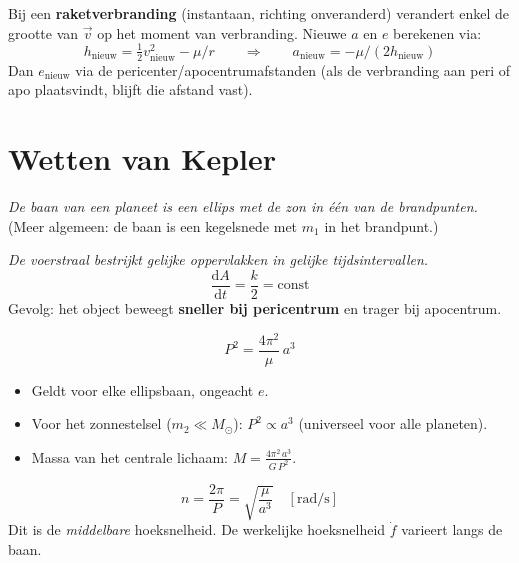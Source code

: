 \documentclass[11pt, a4paper]{article}
\newcommand{\dd}{\mathrm{d}}
\begin{document}
\begin{tip}
Bij een \textbf{raketverbranding} (instantaan, richting onveranderd) verandert enkel de grootte van $\vec{v}$ op het moment van verbranding. Nieuwe $a$ en $e$ berekenen via:
\[
  h_\mathrm{nieuw} = \tfrac{1}{2}v_\mathrm{nieuw}^2 - \mu/r
  \qquad \Rightarrow \qquad a_\mathrm{nieuw} = -\mu/(2h_\mathrm{nieuw})
\]
Dan $e_\mathrm{nieuw}$ via de pericenter/apocentrumafstanden (als de verbranding aan peri of apo plaatsvindt, blijft die afstand vast).
\end{tip}

\section{Wetten van Kepler}

\begin{formule}
\textit{De baan van een planeet is een ellips met de zon in één van de brandpunten.}\\[4pt]
(Meer algemeen: de baan is een kegelsnede met $m_1$ in het brandpunt.)
\end{formule}

\begin{formule}
\textit{De voerstraal bestrijkt gelijke oppervlakken in gelijke tijdsintervallen.}
\[
  \frac{\dd A}{\dd t} = \frac{k}{2} = \mathrm{const}
\]
Gevolg: het object beweegt \textbf{sneller bij pericentrum} en trager bij apocentrum.
\end{formule}

\begin{formule}
\[
  \boxed{P^2 = \frac{4\pi^2}{\mu}\,a^3}
\]
\begin{itemize}[leftmargin=1.5em, itemsep=2pt]
  \item Geldt voor elke ellipsbaan, ongeacht $e$.
  \item Voor het zonnestelsel ($m_2 \ll M_\odot$): $P^2 \propto a^3$ (universeel voor alle planeten).
  \item Massa van het centrale lichaam: $M = \frac{4\pi^2\,a^3}{G\,P^2}$.
\end{itemize}
\end{formule}

\begin{weetje}
\[
  n = \frac{2\pi}{P} = \sqrt{\frac{\mu}{a^3}} \quad [\mathrm{rad/s}]
\]
Dit is de \emph{middelbare} hoeksnelheid. De werkelijke hoeksnelheid $\dot{f}$ varieert langs de baan.
\end{weetje}
\end{document}
